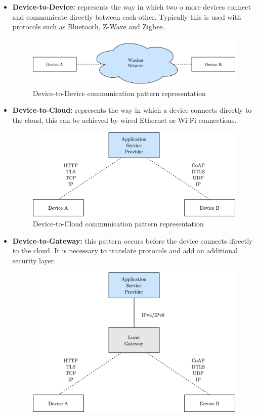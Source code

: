 \documentclass[11pt]{book}
\begin{document}
\begin{itemize}
\item \textbf{Device-to-Device:} represents the way in which two o more devices connect and communicate directly between each other. Typically this is used with protocols such as Bluetooth, Z-Wave and Zigbee. 
\begin{figure}[H]
	\centering
	\includegraphics [scale=0.165] {devicedevice.png}
	\caption{Device-to-Device communication pattern representation}
\end{figure}
\item \textbf{Device-to-Cloud:} represents the way in which a device connects directly to the cloud, this can be achieved by wired Ethernet or Wi-Fi connections. 
\begin{figure}[H]
	\centering
	\includegraphics [scale=0.165] {devicecloud.png}
	\caption{Device-to-Cloud communication pattern representation}
\end{figure}
\item \textbf{Device-to-Gateway:} this pattern occurs before the device connects directly to the cloud. It is necessary to translate protocols and add an additional security layer.
\begin{figure}[H]
	\centering
	\includegraphics [scale=0.165] {devicegateway.png}

\end{figure}
\end{itemize}
\end{document}
